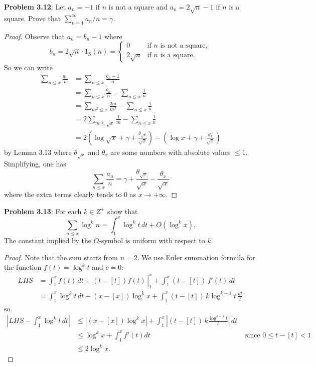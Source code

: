 \documentclass[12pt]{article}
\newcommand{\Abs}[1]{\left|#1\right|}
\begin{document}
\fi

\textbf{Problem 3.12}: Let $a_n = -1$ if $n$ is not a square and $a_n = 2 \sqrt{n} - 1$ if $n$ is a square. Prove that $\sum_{n=1}^{\infty} a_n / n = \gamma$.

\begin{proof}
Observe that $a_n = b_n - 1$ where
$$b_n = 2 \sqrt{n} \cdot 1_S(n) = \begin{cases}
0 &\text{if }n \text{ is not a square},\\
2\sqrt{n} &\text{if } n \text{ is a square}.
\end{cases}$$
So we can write
\begin{align*}
\sum_{n \leq x} \frac{a_n}{n} &= \sum_{n \leq x} \frac{b_n - 1}{n}\\
&= \sum_{n \leq x} \frac{b_n}{n} - \sum_{n \leq x} \frac{1}{n}\\
&= \sum_{m^2 \leq x} \frac{2 m}{m^2} - \sum_{n \leq x} \frac{1}{n}\\
&= 2 \sum_{m \leq \sqrt{x}} \frac{1}{m} - \sum_{n \leq x} \frac{1}{n}\\
&= 2 \left(\log \sqrt{x} + \gamma + \frac{\theta_{\sqrt{x}}}{\sqrt{x}} \right) - \left(\log x + \gamma + \frac{\theta_x}{\sqrt{x}} \right)
\end{align*}
by Lemma 3.13 where $\theta_{\sqrt{x}}$ and $\theta_x$ are some numbers with absolute values $\leq 1$. Simplifying, one has
$$\sum_{n \leq x} \frac{a_n}{n} = \gamma + \frac{\theta_{\sqrt{x}}}{\sqrt{x}} - \frac{\theta_x}{\sqrt{x}}$$
where the extra terms clearly tends to 0 as $x \rightarrow +\infty$.
\end{proof}

\textbf{Problem 3.13}: For each $k \in Z^+$ show that
$$\sum_{n \leq x} \log^k n = \int_1^x \log^k t \, dt + O(\log^k x).$$
The constant implied by the $O$-symbol is uniform with respect to $k$.

\begin{proof}
Note that the sum starts from $n = 2$. We use Euler summation formula for the function $f(t) = \log^k t$ and $c = 0$:
\begin{align*}
LHS &= \left. \int_1^x f(t) \, dt + (t - [t]) f(t) \, \right|_1^x + \int_1^x (t - [t]) \, f'(t) \, dt\\
&= \int_1^x \log^k t \, dt + (x - [x]) \log^k x + \int_1^x (t - [t]) \, k \log^{k-1} t \, \frac{dt}{t}
\end{align*}
so
\begin{align*}
\Abs{ LHS - \int_1^x \log^k t \, dt } &\leq \Abs{ (x - [x]) \log^k x } + \int_1^x \Abs{ (t - [t]) \, k \frac{\log^{k-1} t}{t} } \, dt\\
&\leq \log^k x + \int_1^x f'(t) dt &\text{ since } 0 \leq t - [t] < 1\\
&\leq 2 \log^k x.
\end{align*}
\end{proof}

\unless\ifdefined\IsMainDocument
\end{document}
